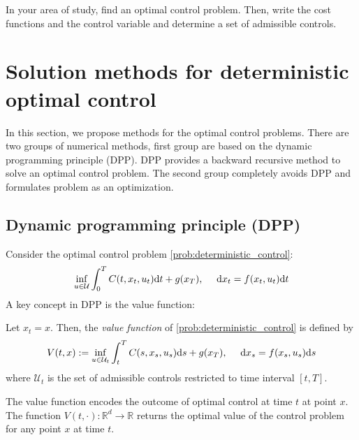\documentclass[11pt]{book}
\newcommand{\dt}{\text{\normalfont d}t}
\newcommand{\ds}{\text{\normalfont d}s}
\newcommand{\dx}{\text{\normalfont d}x}
\begin{document}
\begin{ex}
    In your area of study, find an optimal control problem. Then, write the cost functions and the control variable and determine a set of admissible controls. 
\end{ex}



\section{Solution methods for deterministic optimal control}
\label{sec:sol_deter}
In this section, we propose methods for the optimal control problems. There are two groups of numerical methods, first group are based on the dynamic programming principle (DPP). DPP provides a backward recursive method to solve an optimal control problem.  The second group completely avoids DPP and formulates problem as an optimization. 
\subsection{Dynamic programming principle (DPP)}
\label{sec:dpp_deter}
Consider the optimal control problem \eqref{prob:deterministic_control}:
\begin{equation}
    \inf_{u\in\mathcal{U}}\int_0^TC(t,x_t,u_t){\dt}+g(x_T),~~~~{\dx}_t=f(x_t,u_t){\dt}
\end{equation}
A key concept in DPP is the value function:
\begin{defn}
Let $x_t=x$. Then, the \emph{value function} of \eqref{prob:deterministic_control} is defined by
\begin{equation}\label{eqn:value_deterministic}
    V(t,x):= \inf_{u\in\mathcal{U}_{t}}\int_t^TC(s,x_s,u_s){{\ds}}+g(x_T),~~~~{\dx}_s=f(x_s,u_s){{\ds}}
\end{equation}
where $\mathcal{U}_{t}$ is the set of admissible controls restricted to time interval $[t,T]$.
\end{defn}
The value function encodes the outcome of optimal control at time $t$ at point $x$. The function $V(t,\cdot):\mathbb{R}^d\to\mathbb{R}$ returns the optimal value of the control problem for any point $x$ at time $t$.
\end{document}
